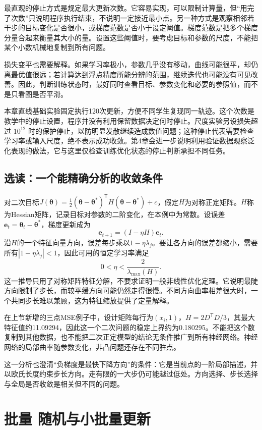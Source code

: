 最直观的停止方式是规定最大更新次数。它容易实现，可以限制计算量，但``用完了次数''只说明程序执行结束，不说明一定接近最小点。另一种方式是观察相邻若干步的目标变化是否很小，或梯度范数是否小于设定阈值。梯度范数是把多个梯度分量合起来衡量其大小的量。设置这些阈值时，要考虑目标和参数的尺度，不能把某个小数机械地复制到所有问题。

损失变平也需要解释。如果学习率极小，参数几乎没有移动，曲线可能很平，却仍离最优值很远；若计算达到浮点精度所能分辨的范围，继续迭代也可能没有可见改善。因此，判断训练状态时，最好同时查看目标、参数变化和必要的参照值，而不是只看图是否平滑。

本章直线基础实验固定执行120次更新，方便不同学生复现同一轨迹。这个次数是教学中的停止设置，程序并没有利用保留数据决定何时停止。尺度实验另设损失超过 \(10^{12}\) 时的保护停止，以防明显发散继续造成数值问题；这种停止代表需要检查学习率或输入尺度，绝不表示成功收敛。第4章会进一步说明利用验证数据观察泛化表现的做法，它与这里仅检查训练优化状态的停止判断承担不同任务。

\subsection{选读：一个能精确分析的收敛条件}
对二次目标$J(\boldsymbol\theta)=\frac12(\boldsymbol\theta-\boldsymbol\theta^*)^{\mathsf T}H(\boldsymbol\theta-\boldsymbol\theta^*)+c$，假定$H$为对称正定矩阵。$H$称为Hessian矩阵，记录目标对参数的二阶变化，在本例中为常数。设误差$\mathbf e_t=\boldsymbol\theta_t-\boldsymbol\theta^*$，梯度更新成为
\[
\mathbf e_{t+1}=(I-\eta H)\mathbf e_t.
\]
沿$H$的一个特征向量方向，误差每步乘以$1-\eta\lambda_j$。要让各方向的误差都缩小，需要所有$|1-\eta\lambda_j|<1$，因此可用的恒定学习率满足
\[
0<\eta<\frac{2}{\lambda_{\max}(H)}.
\]
这一推导只用了对称矩阵特征分解，不要求证明一般非线性优化定理。它说明最陡方向限制了步长，而较平缓方向可能仍然走得很慢。不同方向曲率相差很大时，一个共同步长难以兼顾，这为特征缩放提供了定量解释。

在上节新增的三点MSE例子中，设计矩阵每行为$(x_i,1)$，$H=2D^{\mathsf T}D/3$，其最大特征值约11.09294，因此这一个二次问题的稳定上界约为0.180295。不能把这个数复制到其他数据，也不能把二次正定模型的结论无条件推广到所有神经网络。神经网络的局部曲率随参数变化，非凸问题还存在不同驻点。

这一分析也澄清“负梯度是最快下降方向”的条件：它是当前点的一阶局部描述，并以欧氏长度约束步长方向。走有限的一大步仍可能越过低处。方向选择、步长选择与全局是否收敛是相关但不同的问题。

\section{批量 随机与小批量更新}


